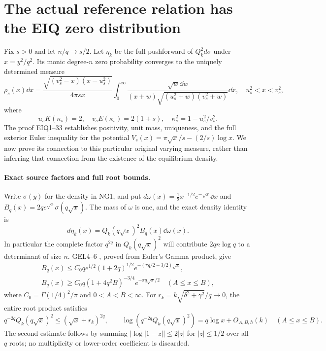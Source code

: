 \documentclass[11pt]{article}
\begin{document}
\section{The actual reference relation has the EIQ zero distribution}
Fix $s>0$ and let $n/q\to s/2$. Let $\eta_k$ be the full pushforward
of $Q_k^2d\sigma$ under $x=y^2/q^2$. Its monic degree-$n$ zero
probability converges to the uniquely determined measure
\begin{equation}\tag{NG10}
 \rho_s(x)\dd x=
 \frac{\sqrt{(v_s^2-x)(x-u_s^2)}}{4\pi s x}
 \int_0^\infty\frac{\sqrt w\dd w}
 {(x+w)\sqrt{(u_s^2+w)(v_s^2+w)}}\dd x,
 \quad u_s^2<x<v_s^2,
\end{equation}
where
\begin{equation}\tag{NG11}
 u_sK(\kappa_s)=2,\quad v_sE(\kappa_s)=2(1+s),
 \quad \kappa_s^2=1-u_s^2/v_s^2.
\end{equation}
The proof EIQ1--33 \cite{cumulative} establishes positivity, unit mass,
uniqueness, and the full exterior Euler inequality for the potential
$V_s(x)=\pi\sqrt x/s-(2/s)\log x$. We now prove its connection to
this particular original varying measure, rather than inferring that
connection from the existence of the equilibrium density.

\paragraph{Exact source factors and full root bounds.}
Write $\sigma(y)$ for the density in NG1, and put
$d\omega(x)=\frac12x^{-1/2}e^{-\sqrt x}\dd x$ and
$B_q(x)=2q e^{\sqrt x}\sigma(q\sqrt x)$. The mass of $\omega$ is one,
and the exact density identity is
\begin{equation}\tag{NG12}
 d\eta_k(x)=Q_k(q\sqrt x)^2B_q(x)\dd\omega(x).
\end{equation}
In particular the complete factor $q^{2q}$ in $Q_k(q\sqrt x)^2$
will contribute $2qn\log q$ to a determinant of size $n$.
GEL4--6 \cite{cumulative}, proved from Euler's Gamma product, give
\begin{gather*}
 B_q(x)\le C_0q e^{1/2}(1+2q)^{1/2}
             e^{-(\pi q/2-3/2)\sqrt x},\\
 B_q(x)\ge C_0q(1+4q^2B)^{-3/4}e^{-\pi q\sqrt x/2}
 \quad(A\le x\le B),
\end{gather*}
where $C_0=\Gamma(1/4)^2/\pi$ and $0<A<B<\infty$.
For $r_k=k\sqrt{\delta^2+\gamma^2}/q\to0$, the entire root product
satisfies
\begin{equation}\tag{NG13}
 q^{-2q}Q_k(q\sqrt x)^2\le(\sqrt x+r_k)^{2q},\qquad
 \log(q^{-2q}Q_k(q\sqrt x)^2)=q\log x+O_{A,B,h}(k)
 \quad(A\le x\le B).
\end{equation}
The second estimate follows by summing
$|\log|1-z||\le2|z|$ for $|z|\le1/2$ over all $q$ roots;
no multiplicity or lower-order coefficient is discarded.
\end{document}
